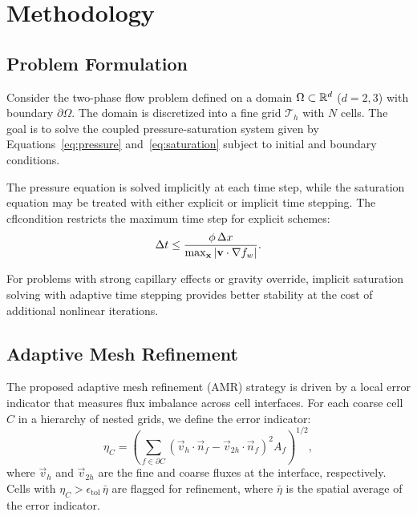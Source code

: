 \chapter{Methodology}
\label{ch:methodology}

\section{Problem Formulation}
\label{sec:methodology:formulation}

Consider the two-phase flow problem defined on a domain $\Omega \subset \mathbb{R}^d$ ($d = 2, 3$) with boundary $\partial \Omega$. The domain is discretized into a fine grid $\mathcal{T}_h$ with $N$ cells. The goal is to solve the coupled pressure-saturation system given by Equations~\eqref{eq:pressure} and~\eqref{eq:saturation} subject to initial and boundary conditions.

The pressure equation is solved implicitly at each time step, while the saturation equation may be treated with either explicit or implicit time stepping. The \gls{cflcondition} restricts the maximum time step for explicit schemes:
\begin{equation}
    \Delta t \leq \frac{\phi \, \Delta x}{\max_{\mathbf{x}} \left| \mathbf{v} \cdot \nabla f_w \right|}.
    \label{eq:cfl}
\end{equation}

For problems with strong capillary effects or gravity override, implicit saturation solving with adaptive time stepping provides better stability at the cost of additional nonlinear iterations.

\section{Adaptive Mesh Refinement}
\label{sec:methodology:amr}

The proposed adaptive mesh refinement (AMR) strategy is driven by a local error indicator that measures flux imbalance across cell interfaces. For each coarse cell $C$ in a hierarchy of nested grids, we define the error indicator:
\begin{equation}
    \eta_C = \left( \sum_{f \in \partial C} \left( \vec{v}_h \cdot \vec{n}_f - \vec{v}_{2h} \cdot \vec{n}_f \right)^2 A_f \right)^{1/2},
    \label{eq:indicator}
\end{equation}
where $\vec{v}_h$ and $\vec{v}_{2h}$ are the fine and coarse fluxes at the interface, respectively. Cells with $\eta_C > \epsilon_{\text{tol}} \, \bar{\eta}$ are flagged for refinement, where $\bar{\eta}$ is the spatial average of the error indicator.

